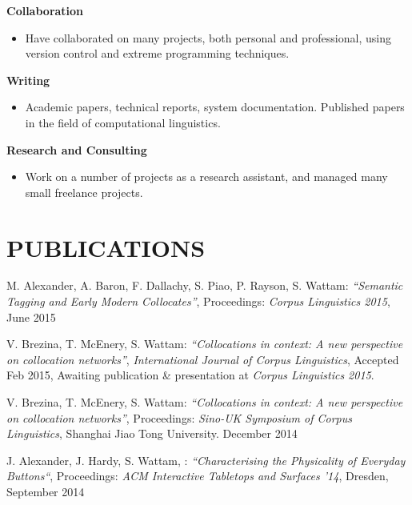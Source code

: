 \documentclass{res}
\begin{document}
\begin{resume}
  {\bf Collaboration}
    \begin{itemize}
      \item[] Have collaborated on many projects, both personal and professional, using
          version control and extreme programming techniques.
      \end{itemize}

  {\bf Writing}
    \begin{itemize} %
      \item[] Academic papers, technical reports, system documentation.
        Published papers in the field of computational linguistics.
      \end{itemize}


   {\bf  Research and Consulting}
        \begin{itemize}
        \item[] Work on a number of projects as a research assistant, and managed many small freelance projects.
       \end{itemize}



\section{PUBLICATIONS}
\vspace{0.1in}

M. Alexander, A. Baron, F. Dallachy, S. Piao, P. Rayson, S. Wattam:
\textsl{``Semantic Tagging and Early Modern Collocates''},
Proceedings: {\it Corpus Linguistics 2015},
June 2015



V. Brezina, T. McEnery, S. Wattam:
\textsl{``Collocations in context: A new perspective on collocation networks''},
{\it International Journal of Corpus Linguistics},
Accepted Feb 2015,
Awaiting publication \& presentation at {\it Corpus Linguistics 2015}.



V. Brezina, T. McEnery, S. Wattam:
\textsl{``Collocations in context: A new perspective on collocation networks''},
Proceedings: {\it Sino-UK Symposium of Corpus Linguistics},
Shanghai Jiao Tong University.
December 2014


J. Alexander, J. Hardy, S. Wattam, :
\textsl{``Characterising the Physicality of Everyday Buttons``},
Proceedings: {\it ACM Interactive Tabletops and Surfaces '14},
Dresden,
September 2014



\end{resume}
\end{document}
